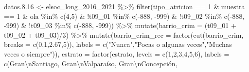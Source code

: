 \documentclass[
  12pt,
]{book}
\newenvironment{Shaded}{\begin{snugshade}}{\end{snugshade}}
\newcommand{\AttributeTok}[1]{\textcolor[rgb]{0.77,0.63,0.00}{#1}}
\newcommand{\DecValTok}[1]{\textcolor[rgb]{0.00,0.00,0.81}{#1}}
\newcommand{\FloatTok}[1]{\textcolor[rgb]{0.00,0.00,0.81}{#1}}
\newcommand{\FunctionTok}[1]{\textcolor[rgb]{0.00,0.00,0.00}{#1}}
\newcommand{\NormalTok}[1]{#1}
\newcommand{\OtherTok}[1]{\textcolor[rgb]{0.56,0.35,0.01}{#1}}
\newcommand{\SpecialCharTok}[1]{\textcolor[rgb]{0.00,0.00,0.00}{#1}}
\newcommand{\StringTok}[1]{\textcolor[rgb]{0.31,0.60,0.02}{#1}}
\begin{document}
\begin{Shaded}
\begin{Highlighting}[]
\NormalTok{datos.}\FloatTok{8.16} \OtherTok{\textless{}{-}}\NormalTok{ elsoc\_long\_2016\_2021 }\SpecialCharTok{\%\textgreater{}\%} 
  \FunctionTok{filter}\NormalTok{(tipo\_atricion }\SpecialCharTok{==} \DecValTok{1} \SpecialCharTok{\&}\NormalTok{ muestra }\SpecialCharTok{==} \DecValTok{1} \SpecialCharTok{\&}\NormalTok{ ola }\SpecialCharTok{\%in\%} \FunctionTok{c}\NormalTok{(}\DecValTok{4}\NormalTok{,}\DecValTok{5}\NormalTok{) }\SpecialCharTok{\&}
           \SpecialCharTok{!}\NormalTok{t09\_01 }\SpecialCharTok{\%in\%} \FunctionTok{c}\NormalTok{(}\SpecialCharTok{{-}}\DecValTok{888}\NormalTok{, }\SpecialCharTok{{-}}\DecValTok{999}\NormalTok{) }\SpecialCharTok{\&} \SpecialCharTok{!}\NormalTok{t09\_02 }\SpecialCharTok{\%in\%} \FunctionTok{c}\NormalTok{(}\SpecialCharTok{{-}}\DecValTok{888}\NormalTok{, }\SpecialCharTok{{-}}\DecValTok{999}\NormalTok{) }\SpecialCharTok{\&} \SpecialCharTok{!}\NormalTok{t09\_03 }\SpecialCharTok{\%in\%} \FunctionTok{c}\NormalTok{(}\SpecialCharTok{{-}}\DecValTok{888}\NormalTok{, }\SpecialCharTok{{-}}\DecValTok{999}\NormalTok{)) }\SpecialCharTok{\%\textgreater{}\%} 
  \FunctionTok{mutate}\NormalTok{(}\AttributeTok{barrio\_crim =}\NormalTok{ (t09\_01 }\SpecialCharTok{+}\NormalTok{ t09\_02 }\SpecialCharTok{+}\NormalTok{ t09\_03)}\SpecialCharTok{/}\DecValTok{3}\NormalTok{) }\SpecialCharTok{\%\textgreater{}\%} 
  \FunctionTok{mutate}\NormalTok{(}\AttributeTok{barrio\_crim\_rec =} \FunctionTok{factor}\NormalTok{(}\FunctionTok{cut}\NormalTok{(barrio\_crim, }\AttributeTok{breaks =} \FunctionTok{c}\NormalTok{(}\DecValTok{0}\NormalTok{,}\DecValTok{1}\NormalTok{,}\FloatTok{2.67}\NormalTok{,}\DecValTok{5}\NormalTok{)),}
                                  \AttributeTok{labels =} \FunctionTok{c}\NormalTok{(}\StringTok{"Nunca"}\NormalTok{,}\StringTok{"Pocas o algunas veces"}\NormalTok{,}\StringTok{"Muchas veces o siempre"}\NormalTok{)),}
         \AttributeTok{estrato =} \FunctionTok{factor}\NormalTok{(estrato, }\AttributeTok{levels =} \FunctionTok{c}\NormalTok{(}\DecValTok{1}\NormalTok{,}\DecValTok{2}\NormalTok{,}\DecValTok{3}\NormalTok{,}\DecValTok{4}\NormalTok{,}\DecValTok{5}\NormalTok{,}\DecValTok{6}\NormalTok{),}
                          \AttributeTok{labels =} \FunctionTok{c}\NormalTok{(}\StringTok{\textquotesingle{}Gran}\SpecialCharTok{\textbackslash{}n}\StringTok{Santiago\textquotesingle{}}\NormalTok{, }\StringTok{\textquotesingle{}Gran}\SpecialCharTok{\textbackslash{}n}\StringTok{Valparaíso\textquotesingle{}}\NormalTok{, }\StringTok{\textquotesingle{}Gran}\SpecialCharTok{\textbackslash{}n}\StringTok{Concepción\textquotesingle{}}\NormalTok{,}

\end{Highlighting}
\end{Shaded}
\end{document}
